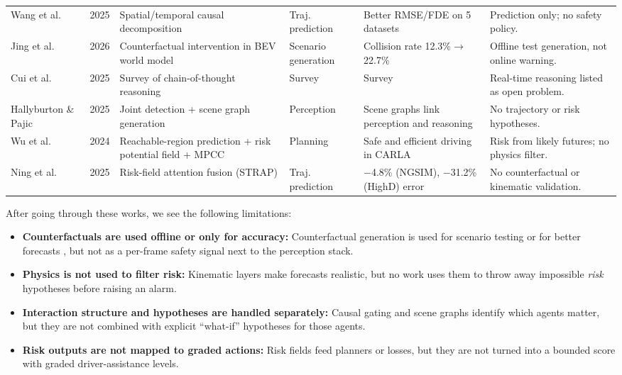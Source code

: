 \documentclass[preprint,12pt]{elsarticle}
\begin{document}
\begin{table}[H]
{\begin{tabular}{l c L{4.0cm} l L{4.0cm} L{5.0cm}}
Wang et al. \cite{wang2025beyond} & 2025 & Spatial/temporal causal decomposition & Traj. prediction & Better RMSE/FDE on 5 datasets & Prediction only; no safety policy. \\
Jing et al. \cite{jing2026counterscene} & 2026 & Counterfactual intervention in BEV world model & Scenario generation & Collision rate 12.3\%$\rightarrow$22.7\% & Offline test generation, not online warning. \\
Cui et al. \cite{cui2025cot} & 2025 & Survey of chain-of-thought reasoning & Survey & Survey & Real-time reasoning listed as open problem. \\
Hallyburton \& Pajic \cite{hallyburton2025neuspaper} & 2025 & Joint detection + scene graph generation & Perception & Scene graphs link perception and reasoning & No trajectory or risk hypotheses. \\
Wu et al. \cite{wu2024riskfield} & 2024 & Reachable-region prediction + risk potential field + MPCC & Planning & Safe and efficient driving in CARLA & Risk from likely futures; no physics filter. \\
Ning et al. \cite{ning2025strap} & 2025 & Risk-field attention fusion (STRAP) & Traj. prediction & $-$4.8\% (NGSIM), $-$31.2\% (HighD) error & No counterfactual or kinematic validation. \\
\hline
\end{tabular}
}
\end{table}

After going through these works, we see the following limitations:
\begin{itemize}
    \item \textbf{Counterfactuals are used offline or only for accuracy:} Counterfactual generation is used for scenario testing \cite{jing2026counterscene} or for better forecasts \cite{han2025cicr, wang2025beyond}, but not as a per-frame safety signal next to the perception stack.
    \item \textbf{Physics is not used to filter risk:} Kinematic layers \cite{liao2024physics, baden2025tpk, chugh2025xtrack, li2025physvarmix} make forecasts realistic, but no work uses them to throw away impossible \emph{risk} hypotheses before raising an alarm.
    \item \textbf{Interaction structure and hypotheses are handled separately:} Causal gating \cite{ahmadi2025critic} and scene graphs \cite{hallyburton2025neuspaper} identify which agents matter, but they are not combined with explicit ``what-if'' hypotheses for those agents.
    \item \textbf{Risk outputs are not mapped to graded actions:} Risk fields \cite{wu2024riskfield, ning2025strap} feed planners or losses, but they are not turned into a bounded score with graded driver-assistance levels.
\end{itemize}
\end{document}
